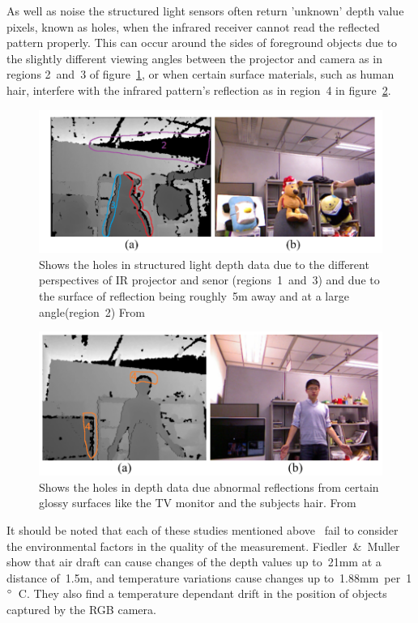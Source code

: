 \documentclass[11pt]{article} %
\begin{document}
As well as noise the structured light sensors often return 'unknown' depth value pixels, known as holes, when the infrared receiver cannot read the reflected pattern properly. This can occur around the sides of foreground objects due to the slightly different viewing angles between the projector and camera as in regions 2~and~3 of figure~\ref{fig:kinectHoles4}, or when certain surface materials, such as human hair, interfere with the infrared pattern's reflection as in region~4 in figure~\ref{fig:kinectHoles3}. 
 \begin{figure}
\includegraphics*[width=1\linewidth,clip]{kinectHoles4}
\caption{Shows the holes in structured light depth data due to the different perspectives of IR projector and senor (regions~1~and~3) and due to the surface of reflection being roughly~5m away and at a large angle(region~2) From~\cite{Feng2013}		\label{fig:kinectHoles4}  } 
\end{figure}
 \begin{figure}
\includegraphics*[width=1\linewidth,clip]{kinectHoles3}
\caption{Shows the holes in depth data due abnormal reflections from certain glossy surfaces like the TV monitor and the subjects hair.  From~\cite{Feng2013}			\label{fig:kinectHoles3}  } 
\end{figure}

It should be noted that each of these studies mentioned above~\cite{Khoshelham2012a,Smisek2011,Nguyen2012} fail to consider the environmental factors in the quality of the measurement. Fiedler~\&~Muller \cite{Fiedler2013} show that air draft can cause changes of the depth values up to~21mm at a distance of~1.5m, and temperature variations cause changes up to~1.88mm~per~1$\degree$~C. They also find a temperature dependant drift in the position of objects captured by the RGB camera.
\end{document}
